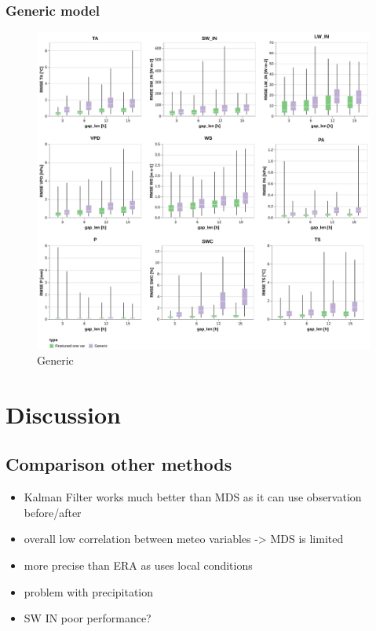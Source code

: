 \documentclass{article}
\newcommand{\imgwidth}{6in}
\let\Oldsection\section
\renewcommand{\section}{\FloatBarrier\Oldsection}
\let\Oldsubsection\subsection
\renewcommand{\subsection}{\FloatBarrier\Oldsubsection}
\begin{document}
\subsubsection{Generic model}

\begin{figure}
\centerline{\includegraphics[width=\imgwidth]{images/generic.png}}
\caption{Generic}
\label{fig:generic}
\end{figure}


\section{Discussion}

\subsection{Comparison other methods}

\begin{itemize}
    \item Kalman Filter works much better than MDS as it can use observation before/after
    \item overall low correlation between meteo variables -> MDS is limited
    \item more precise than ERA as uses local conditions
    \item problem with precipitation
    \item SW IN poor performance?
\end{itemize}
\end{document}

